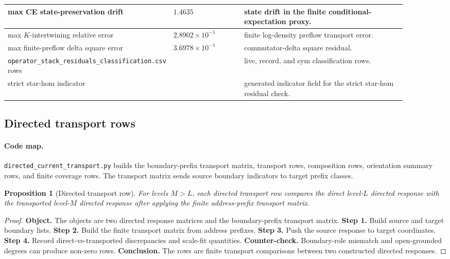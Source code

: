 \documentclass[11pt]{article}
\newtheorem{proposition}[definition]{Proposition}
\theoremstyle{remark}
\newcommand{\code}[1]{\texttt{#1}}
\numberwithin{equation}{section}
\begin{document}
\begin{longtable}{>{\raggedright\arraybackslash}p{0.30\linewidth}>{\raggedleft\arraybackslash}p{0.18\linewidth}>{\raggedright\arraybackslash}p{0.42\linewidth}}
\hline
max CE state-preservation drift & $1.4635$ & state drift in the finite conditional-expectation proxy.\\
\hline
max $K$-intertwining relative error & $2.8902\times10^{-1}$ & finite log-density preflow transport error.\\
\hline
max finite-preflow delta square error & $3.6978\times10^{-1}$ & commutator-delta square residual.\\
\hline
\code{operator\_\allowbreak{}stack\_\allowbreak{}residuals\_\allowbreak{}classification.csv} rows & 3 & live, record, and sym classification rows.\\
\hline
strict star-hom indicator & 0 & generated indicator field for the strict star-hom residual check.\\
\bottomrule
\end{longtable}

\subsection{Directed transport rows}
\paragraph{Code map.} \code{directed\_\allowbreak{}current\_\allowbreak{}transport.py} builds the boundary-prefix transport matrix, transport rows, composition rows, orientation summary rows, and finite coverage rows. The transport matrix sends source boundary indicators to target prefix classes.

\begin{proposition}[Directed transport row]
For levels $M>L$, each directed transport row compares the direct level-$L$ directed response with the transported level-$M$ directed response after applying the finite address-prefix transport matrix.
\end{proposition}
\begin{proof}
\textbf{Object.} The objects are two directed response matrices and the boundary-prefix transport matrix. \textbf{Step 1.} Build source and target boundary lists. \textbf{Step 2.} Build the finite transport matrix from address prefixes. \textbf{Step 3.} Push the source response to target coordinates. \textbf{Step 4.} Record direct-vs-transported discrepancies and scale-fit quantities. \textbf{Counter-check.} Boundary-role mismatch and open-grounded degrees can produce non-zero rows. \textbf{Conclusion.} The rows are finite transport comparisons between two constructed directed responses.
\end{proof}
\end{document}
